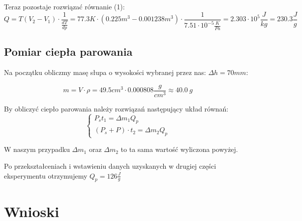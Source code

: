 \documentclass{article}
\begin{document}
Teraz pozostaje rozwiązać równanie (1):
\begin{equation}
	Q = T(V_2-V_1) \cdot \frac{1}{\frac{dT}{dp}} = 77.3K \cdot (0.225 m^3 - 0.001238 m^3) \cdot \frac{1}{7.51 \cdot 10^{-5} \frac{K}{Pa}} = 2.303 \cdot 10^{5} \frac{J}{kg} = 230.3 \frac{J}{g}
\end{equation}

\subsection{Pomiar ciepła parowania}
Na początku obliczmy masę słupa o wysokości wybranej przez nas: $\Delta h = 70 mm$:

\begin{equation}
	m = V \cdot \rho = 49.5 cm^3 \cdot 0.000808 \frac{g}{cm^3} \approx 40.0 \:g
\end{equation}

By obliczyć ciepło parowania należy rozwiązań następujący układ równań:
\begin{equation}
	\begin{cases}
	P_s t_1 = \Delta m_1 Q_p \\
	(P_s + P) \cdot t_2 = \Delta m_2 Q_p
	\end{cases}
\end{equation}

W naszym przypadku $\Delta m_1$ oraz $\Delta m_2$ to ta sama wartość wyliczona powyżej.

Po przekształceniach i wstawieniu danych uzyskanych w drugiej części eksperymentu otrzymujemy $Q_p = 126 \frac{J}{g}$
\section{Wnioski}






\end{document}
